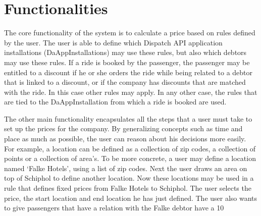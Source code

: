 \section{Functionalities}
The core functionality of the system is to calculate a price based on rules defined by the user. The user is able to define which Dispatch API application installations (DaAppInstallations) may use these rules, but also which debtors may use these rules. If a ride is booked by the passenger, the passenger may be entitled to a discount if he or she orders the ride while being related to a debtor that is linked to a discount, or if the company has discounts that are matched with the ride. In this case other rules may apply. In any other case, the rules that are tied to the DaAppInstallation from which a ride is booked are used.

The other main functionality encapsulates all the steps that a user must take to set up the prices for the company. By generalizing concepts such as time and place as much as possible, the user can reason about his decisions more easily. For example, a location can be defined as a collection of zip codes, a collection of points or a collection of area’s. To be more concrete, a user may define a location named ‘Falke Hotels’, using a list of zip codes. Next the user draws an area on top of Schiphol to define another location. Now these locations may be used in a rule that defines fixed prices from Falke Hotels to Schiphol. The user selects the price, the start location and end location he has just defined. The user also wants to give passengers that have a relation with the Falke debtor have a 10%

